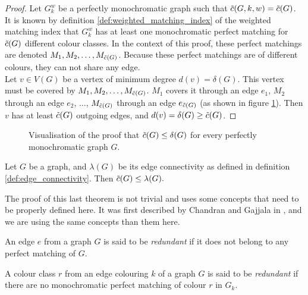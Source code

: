 \begin{proof}
    Let $G_k^w$ be a perfectly monochromatic graph such that $\Tilde{c}(G, k, w) = \Tilde{c}(G)$. It is known by definition \ref{def:weighted_matching_index} of the weighted matching index that $G_k^w$ has at least one monochromatic perfect matching for $\Tilde{c}(G)$ different colour classes. In the context of this proof, these perfect matchings are denoted $M_1, M_2, \dots, M_{\Tilde{c}(G)}$. Because these perfect matchings are of different colours, they can not share any edge.\\
    
    Let $v \in V(G)$ be a vertex of minimum degree $d(v) = \delta(G)$. This vertex must be covered by $M_1, M_2, \dots, M_{\Tilde{c}(G)}$. $M_1$ covers it through an edge $e_1$, $M_2$ through an edge $e_2$, $\dots$, $M_{\Tilde{c}(G)}$ through an edge $e_{\Tilde{c}(G)}$ (as shown in figure \ref{fig:proof_min_degree}). Then $v$ has at least $\Tilde{c}(G)$ outgoing edges, and $d(v) = \delta(G) \geq \Tilde{c}(G)$.
\end{proof}

\begin{figure}[H]
    \caption{Visualisation of the proof that $\Tilde{c}(G) \leq \delta(G)$ for every perfectly monochromatic graph $G$.}
    \label{fig:proof_min_degree}
\end{figure}

\begin{theorem}
    \label{thm:bound_edge_connectivity}
    Let $G$ be a graph, and $\lambda(G)$ be its edge connectivity as defined in definition \ref{def:edge_connectivity}. Then $\Tilde{c}(G) \leq \lambda(G).$
\end{theorem}

The proof of this last theorem is not trivial and uses some concepts that need to be properly defined here. It was first described by Chandran and Gajjala in \cite{chandran}, and we are using the same concepts than them here.

\begin{definition}
    \label{def:redundant_edge}
    An edge $e$ from a graph $G$ is said to be \textit{redundant} if it does not belong to any perfect matching of $G$.
\end{definition}

\begin{definition}
    \label{def:redundant_colour_class}
    A colour class $r$ from an edge colouring $k$ of a graph $G$ is said to be \textit{redundant} if there are no monochromatic perfect matching of colour $r$ in $G_k$.
\end{definition}

